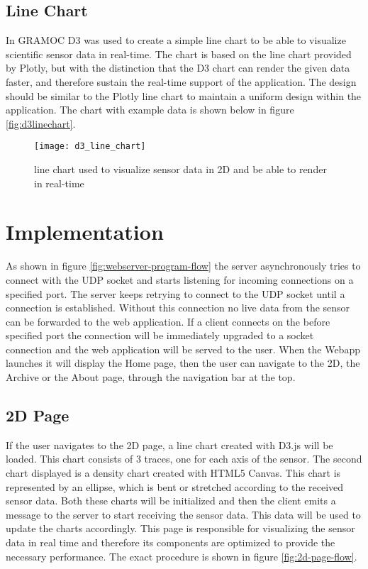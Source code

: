 \subsection{Line Chart}
In GRAMOC D3 was used to create a simple line chart to be able to visualize scientific sensor data in real-time. The chart is based on the line chart provided by Plotly, but with the distinction that the D3 chart can render the given data faster, and therefore sustain the real-time support of the application. The design should be similar to the Plotly line chart to maintain a uniform design within the application. The chart with example data is shown below in figure \vref{fig:d3linechart}.

\begin{figure}[H]
    \centering
    \texttt{[image: d3\_line\_chart]}
    \caption{line chart used to visualize sensor data in 2D and be able to render in real-time}
    \label{fig:d3linechart}
\end{figure}


\section{Implementation}
As shown in figure \vref{fig:webserver-program-flow} the server asynchronously tries to connect with the UDP socket and starts listening for incoming connections on a specified port. The server keeps retrying to connect to the UDP socket until a connection is established. Without this connection no live data from the sensor can be forwarded to the web application. If a client connects on the before specified port the connection will be immediately upgraded to a socket connection and the web application will be served to the user. When the Webapp launches it will display the Home page, then the user can navigate to the 2D, the Archive or the About page, through the navigation bar at the top.

\subsection{2D Page}
If the user navigates to the 2D page, a line chart created with D3.js will be loaded. This chart consists of 3 traces, one for each axis of the sensor. The second chart displayed is a density chart created with HTML5 Canvas. This chart is represented by an ellipse, which is bent or stretched according to the received sensor data. Both these charts will be initialized and then the client emits a message to the server to start receiving the sensor data. This data will be used to update the charts accordingly. This page is responsible for visualizing the sensor data in real time and therefore its components are optimized to provide the necessary performance. The exact procedure is shown in figure \vref{fig:2d-page-flow}.

